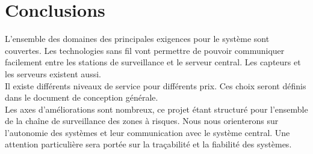\section{Conclusions}

L'ensemble des domaines des principales exigences pour le système sont
couvertes. Les technologies sans fil vont permettre de pouvoir communiquer
facilement entre les stations de surveillance et le serveur central. Les 
capteurs et les serveurs existent aussi.\\
Il existe différents niveaux de service pour différents prix. 
Ces choix seront définis dans le document de conception générale. \\ 

Les axes d'améliorations sont nombreux, ce projet étant structuré pour
l'ensemble de la chaîne de surveillance des zones à risques. Nous nous
orienterons sur l'autonomie des systèmes et leur communication avec le
système central. Une attention particulière sera portée sur la traçabilité
et la fiabilité des systèmes.

